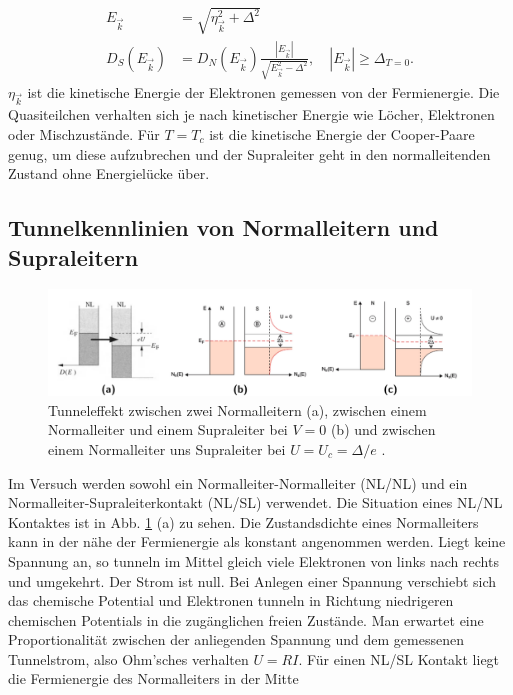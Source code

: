 \documentclass[twoside,        %
               BCOR12mm,       %
               english,ngerman, %
               fleqn,headsepline=false,footsepline=false
              ]{Vorlage/MFPREPORT}
\begin{document}
\begin{align}
    \label{eq:BCS}
    E_{\vec k}&=\sqrt{\eta_{\vec{k}}^2+\Delta^2}\\
    D_S(E_{\vec{k}})&=D_N(E_{\vec{k}})\frac{|E_{\vec k}|}{\sqrt{E_{\vec
    k}^2-\Delta^2}},\quad |E_{\vec k}|\geq\Delta_{T=0}.
\end{align}
$\eta_{\vec k}$ ist die kinetische Energie der Elektronen gemessen von der
Fermienergie. Die Quasiteilchen verhalten sich je nach kinetischer Energie wie
Löcher, Elektronen oder Mischzustände. Für $T=T_c$ ist die kinetische Energie
der Cooper-Paare genug, um diese aufzubrechen und der Supraleiter geht in den
normalleitenden Zustand ohne Energielücke über.

\subsection{Tunnelkennlinien von Normalleitern und Supraleitern}
\begin{figure}[]
    \begin{center}
        \includegraphics[width=\textwidth]{fig/tunnel.png}
    \end{center}
    \caption{Tunneleffekt zwischen zwei Normalleitern (a), zwischen einem
    Normalleiter und einem Supraleiter bei $V=0$ (b) und zwischen einem
    Normalleiter uns Supraleiter bei $U=U_c=\Delta/e$ \cite{dem}
   .}
    \label{fig:tunnel}
\end{figure}
Im Versuch werden sowohl ein Normalleiter-Normalleiter (NL/NL) und ein
Normalleiter-Supraleiterkontakt (NL/SL) verwendet. Die Situation eines NL/NL
Kontaktes ist in Abb. \ref{fig:tunnel} (a) zu sehen. Die Zustandsdichte eines
Normalleiters kann in der nähe der Fermienergie als konstant angenommen werden.
Liegt keine Spannung an, so tunneln im Mittel gleich viele Elektronen von links
nach rechts und umgekehrt. Der Strom ist null. Bei Anlegen einer Spannung
verschiebt sich das chemische Potential und Elektronen tunneln in Richtung
niedrigeren chemischen Potentials in die zugänglichen freien Zustände.
Man erwartet eine Proportionalität zwischen der anliegenden Spannung und dem
gemessenen Tunnelstrom, also Ohm'sches verhalten $U=RI$.
Für einen NL/SL Kontakt liegt die Fermienergie des Normalleiters in der Mitte
\end{document}
